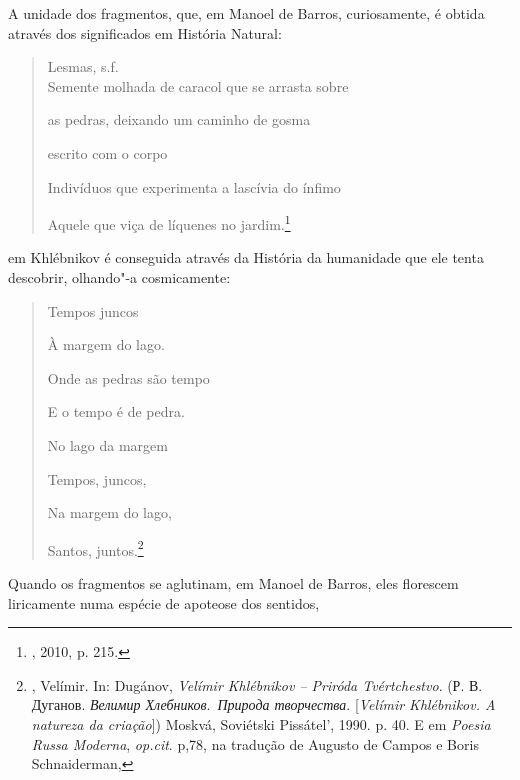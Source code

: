 A unidade dos fragmentos, que, em Manoel de Barros, curiosamente, é
obtida através dos significados em História Natural:

\begin{quote}
Lesmas, s.f.~\\
Semente molhada de caracol que se arrasta sobre

as pedras, deixando um caminho de gosma

escrito com o corpo

Indivíduos que experimenta a lascívia do ínfimo

Aquele que viça de líquenes no jardim.\footnote{, 2010, p. 215.}
\end{quote}

em Khlébnikov é conseguida através da História da humanidade que ele
tenta descobrir, olhando"-a cosmicamente:

\begin{quote}
Tempos juncos

À margem do lago.

Onde as pedras são tempo

E o tempo é de pedra.

No lago da margem

Tempos, juncos,

Na margem do lago,

Santos, juntos.\footnote{, Velímir. In: Dugánov, 
  \emph{Velímir Khlébnikov -- Priróda Tvértchestvo}. (Р. В. Дуганов.
  \emph{Велимир Хлебников}.~\emph{Природа творчества}. {[}\emph{Velímir
  Khlébnikov. A natureza da criação}{]}) Moskvá, Soviétski Pissátel',
  1990. p. 40. E em \emph{Poesia Russa Moderna}, \emph{op.cit}. p,78, na
  tradução de Augusto de Campos e Boris Schnaiderman,}
\end{quote}

Quando os fragmentos se aglutinam, em Manoel de Barros, eles florescem
liricamente numa espécie de apoteose dos sentidos,

